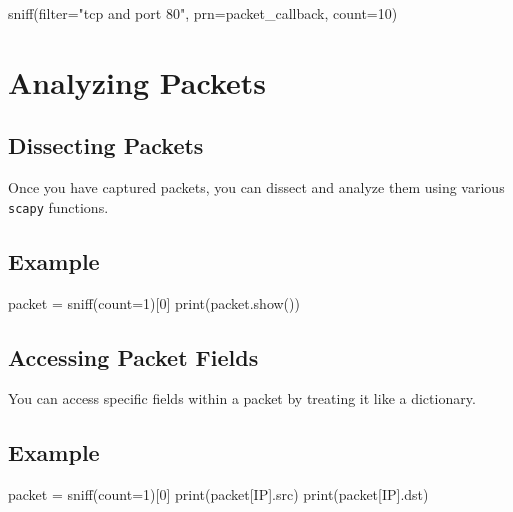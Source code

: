 \documentclass[
  letterpaper,
  DIV=11,
  numbers=noendperiod]{scrreprt}
\newenvironment{Shaded}{\begin{snugshade}}{\end{snugshade}}
\newcommand{\BuiltInTok}[1]{\textcolor[rgb]{0.00,0.23,0.31}{#1}}
\newcommand{\DecValTok}[1]{\textcolor[rgb]{0.68,0.00,0.00}{#1}}
\newcommand{\NormalTok}[1]{\textcolor[rgb]{0.00,0.23,0.31}{#1}}
\newcommand{\OperatorTok}[1]{\textcolor[rgb]{0.37,0.37,0.37}{#1}}
\newcommand{\StringTok}[1]{\textcolor[rgb]{0.13,0.47,0.30}{#1}}
\begin{document}
\begin{Shaded}
\begin{Highlighting}[]
\NormalTok{sniff(}\BuiltInTok{filter}\OperatorTok{=}\StringTok{"tcp and port 80"}\NormalTok{, prn}\OperatorTok{=}\NormalTok{packet\_callback, count}\OperatorTok{=}\DecValTok{10}\NormalTok{)}
\end{Highlighting}
\end{Shaded}

\section{Analyzing Packets}\label{analyzing-packets}

\subsection{Dissecting Packets}\label{dissecting-packets}

Once you have captured packets, you can dissect and analyze them using
various \texttt{scapy} functions.

\subsection{Example}\label{example-65}

\begin{Shaded}
\begin{Highlighting}[]
\NormalTok{packet }\OperatorTok{=}\NormalTok{ sniff(count}\OperatorTok{=}\DecValTok{1}\NormalTok{)[}\DecValTok{0}\NormalTok{]}
\BuiltInTok{print}\NormalTok{(packet.show())}
\end{Highlighting}
\end{Shaded}

\subsection{Accessing Packet Fields}\label{accessing-packet-fields}

You can access specific fields within a packet by treating it like a
dictionary.

\subsection{Example}\label{example-66}

\begin{Shaded}
\begin{Highlighting}[]
\NormalTok{packet }\OperatorTok{=}\NormalTok{ sniff(count}\OperatorTok{=}\DecValTok{1}\NormalTok{)[}\DecValTok{0}\NormalTok{]}
\BuiltInTok{print}\NormalTok{(packet[IP].src)}
\BuiltInTok{print}\NormalTok{(packet[IP].dst)}
\end{Highlighting}
\end{Shaded}
\end{document}
